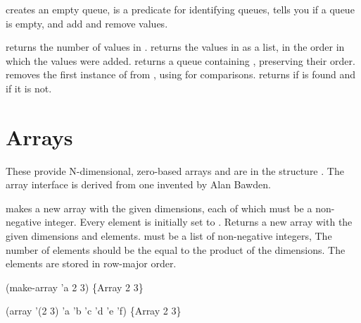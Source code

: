 \begin{protos}
\end{protos}
\noindent 
{} creates an empty queue,  is a predicate for
 identifying queues,  tells you if a queue is empty,
  and  add and remove values.

\begin{protos}
\end{protos}
\noindent
{} returns the number of values in .
 returns the values in  as a list, in the
 order in which the values were added.
 returns a queue containing , preserving
 their order.
 removes the first instance of  from
 , using  for comparisons.
 returns  if  is found and
  if it is not.

\section{Arrays}

These provide N-dimensional, zero-based arrays and
 are in the structure .
The array interface is derived from one invented by Alan Bawden.

\begin{protos}
\end{protos}
\noindent
{} makes a new array with the given dimensions, each of which
 must be a non-negative integer.
Every element is initially set to .
 Returns a new array with the given dimensions and elements.
 must be a list of non-negative integers, 
The number of elements should be the equal to the product of the
 dimensions.
The elements are stored in row-major order.
\begin{example}
(make-array 'a 2 3) \evalsto \{Array 2 3\}

(array '(2 3) 'a 'b 'c 'd 'e 'f)
    \evalsto \{Array 2 3\}
\end{example}

